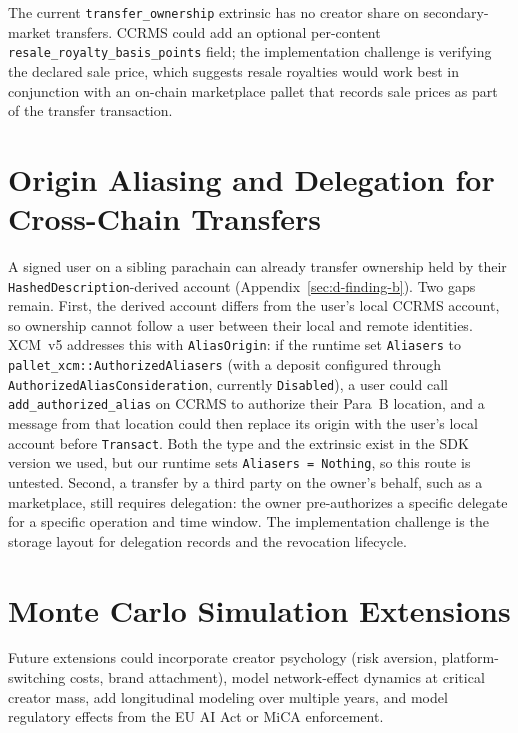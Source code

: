 The current \texttt{transfer\_ownership} extrinsic has no creator share on secondary-market transfers. CCRMS could add an optional per-content \texttt{resale\_royalty\_basis\_points} field; the implementation challenge is verifying the declared sale price, which suggests resale royalties would work best in conjunction with an on-chain marketplace pallet that records sale prices as part of the transfer transaction.

\section[Origin Aliasing and Delegation]{Origin Aliasing and Delegation for Cross-Chain Transfers}\label{sec:e-delegation}

A signed user on a sibling parachain can already transfer ownership held by their \texttt{HashedDescription}-derived account (Appendix~\ref{sec:d-finding-b}). Two gaps remain. First, the derived account differs from the user's local CCRMS account, so ownership cannot follow a user between their local and remote identities. XCM~v5 addresses this with \texttt{AliasOrigin}: if the runtime set \texttt{Aliasers} to \texttt{pallet\_xcm::AuthorizedAliasers} (with a deposit configured through \texttt{AuthorizedAliasConsideration}, currently \texttt{Disabled}), a user could call \texttt{add\_authorized\_alias} on CCRMS to authorize their Para~B location, and a message from that location could then replace its origin with the user's local account before \texttt{Transact}. Both the type and the extrinsic exist in the SDK version we used, but our runtime sets \texttt{Aliasers = Nothing}, so this route is untested. Second, a transfer by a third party on the owner's behalf, such as a marketplace, still requires delegation: the owner pre-authorizes a specific delegate for a specific operation and time window. The implementation challenge is the storage layout for delegation records and the revocation lifecycle.

\section{Monte Carlo Simulation Extensions}\label{sec:e-monte-carlo}

Future extensions could incorporate creator psychology (risk aversion, platform-switching costs, brand attachment), model network-effect dynamics at critical creator mass, add longitudinal modeling over multiple years, and model regulatory effects from the EU AI Act or MiCA enforcement.

